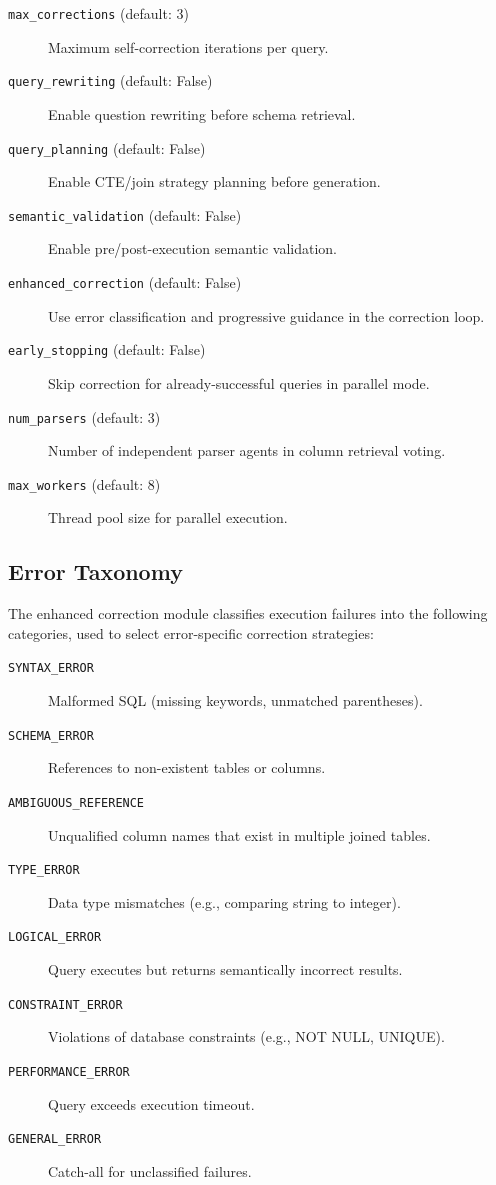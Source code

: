 \begin{description}
    \item[\texttt{max\_corrections} (default: 3)] Maximum self-correction iterations 
    per query.
    \item[\texttt{query\_rewriting} (default: False)] Enable question rewriting before 
    schema retrieval.
    \item[\texttt{query\_planning} (default: False)] Enable CTE/join strategy planning 
    before generation.
    \item[\texttt{semantic\_validation} (default: False)] Enable pre/post-execution 
    semantic validation.
    \item[\texttt{enhanced\_correction} (default: False)] Use error classification and 
    progressive guidance in the correction loop.
    \item[\texttt{early\_stopping} (default: False)] Skip correction for 
    already-successful queries in parallel mode.
    \item[\texttt{num\_parsers} (default: 3)] Number of independent parser agents in 
    column retrieval voting.
    \item[\texttt{max\_workers} (default: 8)] Thread pool size for parallel execution.
\end{description}

\subsection{Error Taxonomy}

The enhanced correction module classifies execution failures into the following 
categories, used to select error-specific correction strategies:

\begin{description}
    \item[\texttt{SYNTAX\_ERROR}] Malformed SQL (missing keywords, unmatched 
    parentheses).
    \item[\texttt{SCHEMA\_ERROR}] References to non-existent tables or columns.
    \item[\texttt{AMBIGUOUS\_REFERENCE}] Unqualified column names that exist in 
    multiple joined tables.
    \item[\texttt{TYPE\_ERROR}] Data type mismatches (e.g., comparing string to 
    integer).
    \item[\texttt{LOGICAL\_ERROR}] Query executes but returns semantically incorrect 
    results.
    \item[\texttt{CONSTRAINT\_ERROR}] Violations of database constraints (e.g., 
    NOT NULL, UNIQUE).
    \item[\texttt{PERFORMANCE\_ERROR}] Query exceeds execution timeout.
    \item[\texttt{GENERAL\_ERROR}] Catch-all for unclassified failures.
\end{description}
